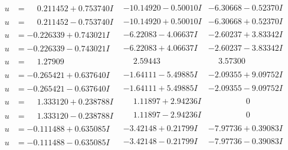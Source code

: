 \documentclass[1p]{elsarticle_modified}
\theoremstyle{definition}
\begin{document}
$$\begin{array}{c|c|c}
\begin{aligned}
u &= \phantom{-}0.211452 + 0.753740 I\end{aligned}
 & -10.14920 - 0.50010 I & -6.30668 - 0.52370 I \\ \hline\begin{aligned}
u &= \phantom{-}0.211452 - 0.753740 I\end{aligned}
 & -10.14920 + 0.50010 I & -6.30668 + 0.52370 I \\ \hline\begin{aligned}
u &= -0.226339 + 0.743021 I\end{aligned}
 & -6.22083 - 4.06637 I & -2.60237 + 3.83342 I \\ \hline\begin{aligned}
u &= -0.226339 - 0.743021 I\end{aligned}
 & -6.22083 + 4.06637 I & -2.60237 - 3.83342 I \\ \hline\begin{aligned}
u &= \phantom{-}1.27909\phantom{ +0.000000I}\end{aligned}
 & \phantom{-}2.59443\phantom{ +0.000000I} & \phantom{-}3.57300\phantom{ +0.000000I} \\ \hline\begin{aligned}
u &= -0.265421 + 0.637640 I\end{aligned}
 & -1.64111 - 5.49885 I & -2.09355 + 9.09752 I \\ \hline\begin{aligned}
u &= -0.265421 - 0.637640 I\end{aligned}
 & -1.64111 + 5.49885 I & -2.09355 - 9.09752 I \\ \hline\begin{aligned}
u &= \phantom{-}1.333120 + 0.238788 I\end{aligned}
 & \phantom{-}1.11897 + 2.94236 I & \phantom{-0.000000 } 0 \\ \hline\begin{aligned}
u &= \phantom{-}1.333120 - 0.238788 I\end{aligned}
 & \phantom{-}1.11897 - 2.94236 I & \phantom{-0.000000 } 0 \\ \hline\begin{aligned}
u &= -0.111488 + 0.635085 I\end{aligned}
 & -3.42148 + 0.21799 I & -7.97736 + 0.39083 I \\ \hline\begin{aligned}
u &= -0.111488 - 0.635085 I\end{aligned}
 & -3.42148 - 0.21799 I & -7.97736 - 0.39083 I \\ \hline\begin{aligned}

\end{aligned}
\end{array}$$
\end{document}
